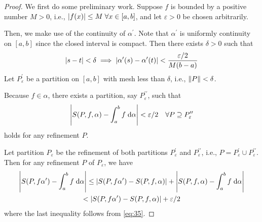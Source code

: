 \documentclass[thmcnt=section, 12pt]{my-elegantbook}
\begin{document}
\begin{proof}
    We first do some preliminary work. Suppose $f$ is bounded by a positive number $M > 0$, i.e., $\left\lvert f(x) \right\rvert \leq M \; \forall x \in [a, b]$, and let $\varepsilon > 0$ be chosen arbitrarily. 

    \par Then, we make use of the continuity of $\alpha^\prime$. Note that $\alpha^\prime$ is uniformly continuity on $[a, b]$ since the closed interval is compact. Then there exists $\delta > 0$ such that 
    \begin{align}
        \left\lvert s-t \right\rvert < \delta
        \implies \left\lvert \alpha^\prime(s) - \alpha^\prime(t) \right\rvert < \frac{\varepsilon / 2}{M(b-a)}
        \label{eq:34}
    \end{align}
    Let $P_\varepsilon^\prime$ be a partition on $[a, b]$ with mesh less than $\delta$, i.e., $\left\lVert P \right\rVert < \delta$.

    \par Because $f \in \mathfrak{\alpha}$, there exists a partition, say $P_\varepsilon^{\prime\prime}$, such that 
    \begin{align}
        \left\lvert S(P,f,\alpha) - \int_{a}^{b} f \; \mathrm{d}\alpha \right\rvert < \varepsilon / 2
        \quad \forall P \supseteq P_\varepsilon^{\prime\prime}
        \label{eq:35}
    \end{align}
    holds for any refinement $P$.

    Let partition $P_\varepsilon$ be the refinement of both partitions $P_\varepsilon^\prime$ and $P_\varepsilon^{\prime\prime}$, i.e., $P = P_\varepsilon^\prime \cup P_\varepsilon^{\prime\prime}$. Then for any refinement $P$ of $P_\varepsilon$, we have 
    \begin{multline}
        \left\lvert S(P, f\alpha^\prime) - \int_{a}^{b}f \; \mathrm{d}\alpha \right\rvert
        \leq \left\lvert S(P, f\alpha^\prime) - S(P, f, \alpha) \right\rvert 
            + \left\lvert S(P, f, \alpha) - \int_{a}^{b}f \; \mathrm{d}\alpha \right\rvert \\
        < \left\lvert S(P, f\alpha^\prime) - S(P, f, \alpha) \right\rvert + \varepsilon / 2
        \label{eq:36}
    \end{multline}
    where the last inequality follows from \eqref{eq:35}. 


\end{proof}
\end{document}
